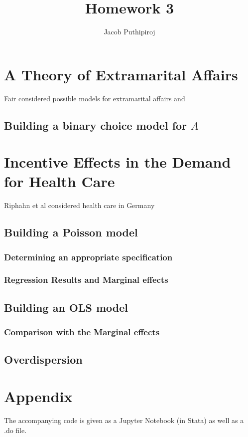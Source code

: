 \documentclass{article}
\begin{document}
\title{Homework 3}
\author{Jacob Puthipiroj}
\maketitle

\section{A Theory of Extramarital Affairs}

Fair considered possible models for extramarital affairs \cite{fair1978theory} and 

\subsection{Building a binary choice model for $A$}

\subsection{}

\section{Incentive Effects in the Demand for Health Care}

Riphahn et al considered health care in Germany \cite{riphahn2003incentive}


\subsection{Building a Poisson model}

\subsubsection{Determining an appropriate specification}

\subsubsection{Regression Results and Marginal effects}

\subsection{Building an OLS model}

\subsubsection{Comparison with the Marginal effects}

\subsection{Overdispersion}


\section{Appendix}
The accompanying code is given as a Jupyter Notebook (in Stata) as well as a .do file.



\end{document}
